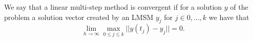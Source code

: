 %	
%	
	
	\begin{frame}
		\begin{definition} \label{def: LMSM convergence}
			We say that a linear multi-step method is convergent if for a solution $y$ of the problem a solution vector created by an LMSM $y_j$ for $j \in {0,...,k}$ we have that
			\begin{displaymath}
				\lim\limits_{h \to \infty} \max_{0 \leq j \leq k} ||y(t_j) - y_j|| = 0.
			\end{displaymath}
		\end{definition}
	\end{frame}
	
